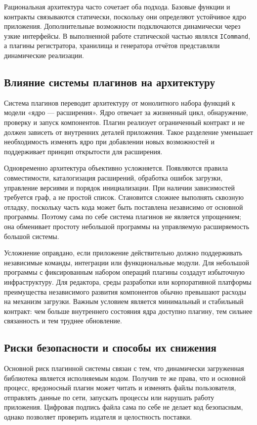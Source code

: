 Рациональная архитектура часто сочетает оба подхода. Базовые функции и контракты связываются статически, поскольку они определяют устойчивое ядро приложения. Дополнительные возможности подключаются динамически через узкие интерфейсы. В выполненной работе статической частью являлся \texttt{ICommand}, а плагины регистратора, хранилища и генератора отчётов представляли динамические реализации.

\subsection{Влияние системы плагинов на архитектуру}

Система плагинов переводит архитектуру от монолитного набора функций к модели «ядро --- расширения». Ядро отвечает за жизненный цикл, обнаружение, проверку и запуск компонентов. Плагин реализует ограниченный контракт и не должен зависеть от внутренних деталей приложения. Такое разделение уменьшает необходимость изменять ядро при добавлении новых возможностей и поддерживает принцип открытости для расширения.

Одновременно архитектура объективно усложняется. Появляются правила совместимости, каталогизация расширений, обработка ошибок загрузки, управление версиями и порядок инициализации. При наличии зависимостей требуется граф, а не простой список. Становится сложнее выполнять сквозную отладку, поскольку часть кода может быть поставлена независимо от основной программы. Поэтому сама по себе система плагинов не является упрощением; она обменивает простоту небольшой программы на управляемую расширяемость большой системы.

Усложнение оправдано, если приложение действительно должно поддерживать независимые команды, интеграции или функциональные модули. Для небольшой программы с фиксированным набором операций плагины создадут избыточную инфраструктуру. Для редактора, среды разработки или корпоративной платформы преимущества независимого развития компонентов обычно превышают расходы на механизм загрузки. Важным условием является минимальный и стабильный контракт: чем больше внутреннего состояния ядра доступно плагину, тем сильнее связанность и тем труднее обновление.

\subsection{Риски безопасности и способы их снижения}

Основной риск плагинной системы связан с тем, что динамически загруженная библиотека является исполняемым кодом. Получив те же права, что и основной процесс, вредоносный плагин может читать и изменять файлы пользователя, отправлять данные по сети, запускать процессы или нарушать работу приложения. Цифровая подпись файла сама по себе не делает код безопасным, однако позволяет проверить издателя и целостность поставки.

